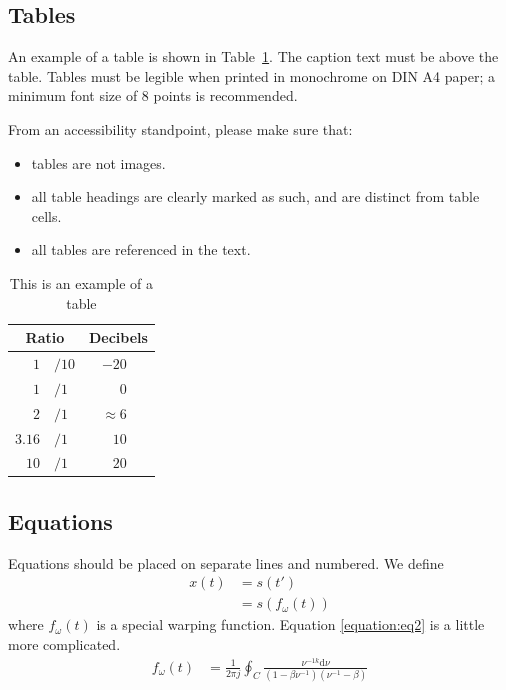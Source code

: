 \documentclass[cameraready]{Interspeech}
\begin{document}
\subsection{Tables}\label{sec:tables}

An example of a table is shown in Table~\ref{tab:example}. The caption text must be above the table. Tables must be legible when printed in monochrome on DIN A4 paper; a minimum font size of 8 points is recommended.

From an accessibility standpoint, please make sure that:
    \begin{itemize}
        \item tables are not images.
        \item all table headings are clearly marked as such, and are distinct from table cells.
        \item all tables are referenced in the text.
    \end{itemize}

\begin{table}[th]
  \caption{This is an example of a table}
  \label{tab:example}
  \centering
  \begin{tabular}{ r@{}l  r }
    \toprule
    \multicolumn{2}{c}{\textbf{Ratio}} &
                                         \multicolumn{1}{c}{\textbf{Decibels}} \\
    \midrule
    $1$                       & $/10$ & $-20$~~~             \\
    $1$                       & $/1$  & $0$~~~               \\
    $2$                       & $/1$  & $\approx 6$~~~       \\
    $3.16$                    & $/1$  & $10$~~~              \\
    $10$                      & $/1$  & $20$~~~              \\
    \bottomrule
  \end{tabular}

\end{table}



\subsection{Equations}

Equations should be placed on separate lines and numbered. We define
%
\begin{align}
  x(t) &= s(t') \nonumber \\
       &= s(f_\omega(t))
\end{align}
%
where \(f_\omega(t)\) is a special warping function. Equation \ref{equation:eq2} is a little more complicated.
%
\begin{align}
  f_\omega(t) &= \frac{1}{2 \pi j} \oint_C
  \frac{\nu^{-1k} \mathrm{d} \nu}
  {(1-\beta\nu^{-1})(\nu^{-1}-\beta)}
  \label{equation:eq2}
\end{align}
%
\end{document}
